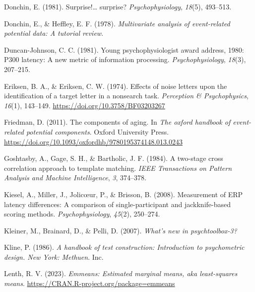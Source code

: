 \documentclass[
  man]{apa7}
\newlength{\cslhangindent}
\newlength{\cslentryspacingunit} %
\newenvironment{CSLReferences}[2] %
 {%
  \setlength{\parindent}{0pt}
  \ifodd #1
  \let\oldpar\par
  \def\par{\hangindent=\cslhangindent\oldpar}
  \fi
  \setlength{\parskip}{#2\cslentryspacingunit}
 }%
 {}
\begin{document}
\begin{CSLReferences}{1}{0}
\leavevmode{}%
Donchin, E. (1981). Surprise!\ldots{} surprise? \emph{Psychophysiology}, \emph{18}(5), 493--513.

\leavevmode{}%
Donchin, E., \& Heffley, E. F. (1978). \emph{Multivariate analysis of event-related potential data: {A} tutorial review}.

\leavevmode{}%
Duncan-Johnson, C. C. (1981). Young psychophysiologist award address, 1980: {P300} latency: A new metric of information processing. \emph{Psychophysiology}, \emph{18}(3), 207--215.

\leavevmode{}%
Eriksen, B. A., \& Eriksen, C. W. (1974). Effects of noise letters upon the identification of a target letter in a nonsearch task. \emph{Perception \& Psychophysics}, \emph{16}(1), 143--149. \url{https://doi.org/10.3758/BF03203267}

\leavevmode{}%
Friedman, D. (2011). The components of aging. In \emph{The oxford handbook of event-related potential components}. Oxford University Press. \url{https://doi.org/10.1093/oxfordhb/9780195374148.013.0243}

\leavevmode{}%
Goshtasby, A., Gage, S. H., \& Bartholic, J. F. (1984). A two-stage cross correlation approach to template matching. \emph{IEEE Transactions on Pattern Analysis and Machine Intelligence}, \emph{3}, 374--378.

\leavevmode{}%
Kiesel, A., Miller, J., Jolicœur, P., \& Brisson, B. (2008). Measurement of {ERP} latency differences: {A} comparison of single-participant and jackknife-based scoring methods. \emph{Psychophysiology}, \emph{45}(2), 250--274.

\leavevmode{}%
Kleiner, M., Brainard, D., \& Pelli, D. (2007). \emph{What's new in psychtoolbox-3?}

\leavevmode{}%
Kline, P. (1986). \emph{A handbook of test construction: {Introduction} to psychometric design. {New} {York}: {Methuen}}. Inc.

\leavevmode{}%
Lenth, R. V. (2023). \emph{Emmeans: Estimated marginal means, aka least-squares means}. \url{https://CRAN.R-project.org/package=emmeans}


\end{CSLReferences}
\end{document}
